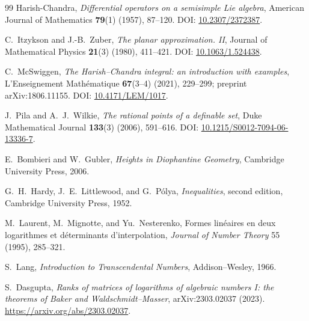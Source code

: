 \documentclass[11pt,oneside]{article}
\theoremstyle{definition}
\theoremstyle{remark}
\begin{document}
\begin{thebibliography}{99}
Harish-Chandra,
\newblock \emph{Differential operators on a semisimple Lie algebra},
\newblock American Journal of Mathematics \textbf{79}(1) (1957), 87--120.
\newblock DOI: \href{https://doi.org/10.2307/2372387}{10.2307/2372387}.

C.~Itzykson and J.-B.~Zuber,
\newblock \emph{The planar approximation. II},
\newblock Journal of Mathematical Physics \textbf{21}(3) (1980), 411--421.
\newblock DOI: \href{https://doi.org/10.1063/1.524438}{10.1063/1.524438}.

C.~McSwiggen,
\newblock \emph{The Harish--Chandra integral: an introduction with examples},
\newblock L'Enseignement Math\'ematique \textbf{67}(3--4) (2021), 229--299;
preprint arXiv:1806.11155.
\newblock DOI: \href{https://doi.org/10.4171/LEM/1017}{10.4171/LEM/1017}.

J.~Pila and A.~J.~Wilkie,
\newblock \emph{The rational points of a definable set},
\newblock Duke Mathematical Journal \textbf{133}(3) (2006), 591--616.
\newblock DOI: \href{https://doi.org/10.1215/S0012-7094-06-13336-7}{10.1215/S0012-7094-06-13336-7}.


E.~Bombieri and W.~Gubler,
\newblock \emph{Heights in Diophantine Geometry},
\newblock Cambridge University Press, 2006.

G.~H.~Hardy, J.~E.~Littlewood, and G.~P\'olya,
\newblock \emph{Inequalities}, second edition,
\newblock Cambridge University Press, 1952.

M.~Laurent, M.~Mignotte, and Yu.~Nesterenko,
\newblock Formes lin\'eaires en deux logarithmes et d\'eterminants
 d'interpolation,
\newblock \emph{Journal of Number Theory} 55 (1995), 285--321.

S.~Lang,
\newblock \emph{Introduction to Transcendental Numbers},
\newblock Addison--Wesley, 1966.




S.~Dasgupta,
\newblock \emph{Ranks of matrices of logarithms of algebraic numbers I: the theorems of
Baker and Waldschmidt--Masser},
\newblock arXiv:2303.02037 (2023).
\newblock \url{https://arxiv.org/abs/2303.02037}.


\end{thebibliography}
\end{document}
